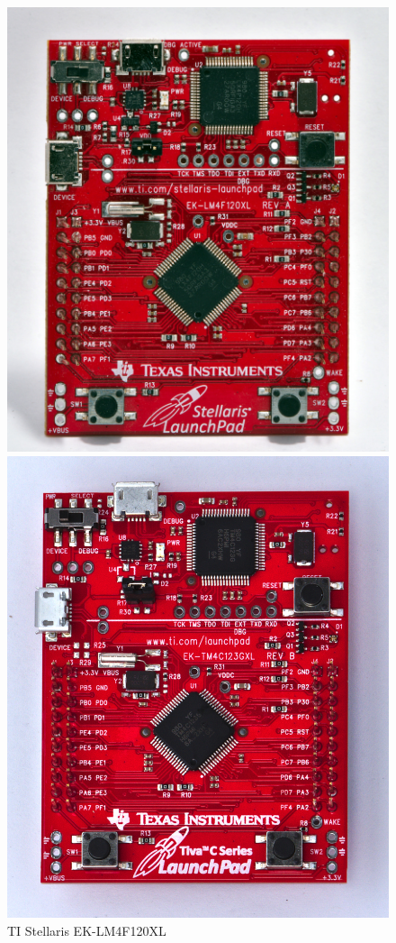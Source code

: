 \documentclass[twoside,11pt]{cergdoc}
\begin{document}
\begin{figure}[ht]
  \centering
  \begin{minipage}{.5\textwidth}
    \centering
    \includegraphics[scale=0.6]{figures/ek-lm4f120xl}
    \caption{TI Stellaris EK-LM4F120XL}\label{fig:stellaris}
  \end{minipage}%
  \begin{minipage}{.5\textwidth}
    \centering
    \includegraphics[scale=0.6]{figures/ek-tm4c123gxl}

\end{minipage}
\end{figure}
\end{document}

